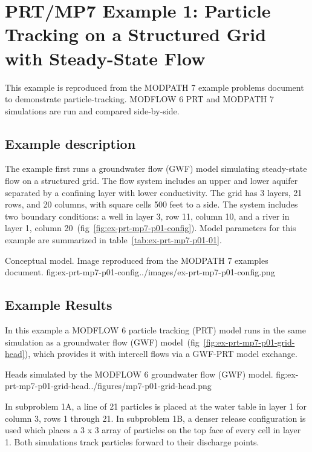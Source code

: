 \section{PRT/MP7 Example 1: Particle Tracking on a Structured Grid with Steady-State Flow}

This example is reproduced from the MODPATH 7 example problems document \citep{modpath7examples} to demonstrate particle-tracking. MODFLOW 6 PRT and MODPATH 7 simulations are run and compared side-by-side.

\subsection{Example description}

The example first runs a groundwater flow (GWF) model simulating steady-state flow on a structured grid. The flow system includes an upper and lower aquifer separated by a confining layer with lower conductivity. The grid has 3 layers, 21 rows, and 20 columns, with square cells 500 feet to a side. The system includes two boundary conditions: a well in layer 3, row 11, column 10, and a river in layer 1, column 20~(fig~\ref{fig:ex-prt-mp7-p01-config}). Model parameters for this example are summarized in table~\ref{tab:ex-prt-mp7-p01-01}.

\begin{StandardFigure}{
    Conceptual model. Image reproduced from the MODPATH 7 examples document.
    }{fig:ex-prt-mp7-p01-config}{../images/ex-prt-mp7-p01-config.png}
\end{StandardFigure}



\subsection{Example Results}

In this example a MODFLOW 6 particle tracking (PRT) model runs in the same simulation as a groundwater flow (GWF) model~(fig~\ref{fig:ex-prt-mp7-p01-grid-head}), which provides it with intercell flows via a GWF-PRT model exchange.

\begin{StandardFigure}{
    Heads simulated by the MODFLOW 6 groundwater flow (GWF) model.
    }{fig:ex-prt-mp7-p01-grid-head}{../figures/mp7-p01-grid-head.png}
\end{StandardFigure}

In subproblem 1A, a line of 21 particles is placed at the water table in layer 1 for column 3, rows 1 through 21. In subproblem 1B, a denser release configuration is used which places a 3 x 3 array of particles on the top face of every cell in layer 1. Both simulations track particles forward to their discharge points.

